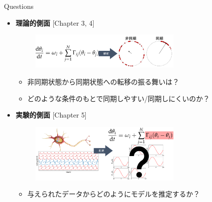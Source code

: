 \begin{frame}{Questions}
\begin{itemize}
  \item \textbf{理論的側面} [Chapter 3, 4]
  \begin{figure}
    \centering
    \includegraphics[width=0.7\textwidth]{figs/theory_ponchi.pdf}
  \end{figure}
  \begin{itemize}
    \item 非同期状態から同期状態への転移の振る舞いは？
    \item どのような条件のもとで同期しやすい/同期しにくいのか？
  \end{itemize}
  \item \textbf{実験的側面} [Chapter 5]
  \begin{figure}
    \includegraphics[width=0.7\textwidth]{figs/gp_coupling_ponchi.pdf}
  \end{figure}
  \begin{itemize}
    \item 与えられたデータからどのようにモデルを推定するか？
  \end{itemize}
\end{itemize}
\end{frame}


